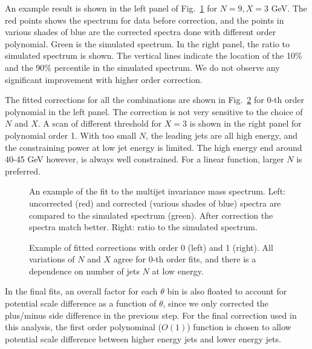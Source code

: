 An example result is shown in the left panel of Fig.~\ref{Figure:JetCalibration-AbsoluteResidualExample} for $N = 9, X = 3$ GeV.  The red points shows the spectrum for data before correction, and the points in various shades of blue are the corrected spectra done with different order polynomial.  Green is the simulated spectrum.  In the right panel, the ratio to simulated spectrum is shown.  The vertical lines indicate the location of the 10\% and the 90\% percentile in the simulated spectrum.  We do not observe any significant improvement with higher order correction.

The fitted corrections for all the combinations are shown in Fig.~\ref{Figure:JetCalibration-AbsoluteResidualFitExample} for 0-th order polynomial in the left panel.  The correction is not very sensitive to the choice of $N$ and $X$.  A scan of different threshold for $X = 3$ is shown in the right panel for polynomial order 1.  With too small $N$, the leading jets are all high energy, and the constraining power at low jet energy is limited.  The high energy end around 40-45 GeV however, is always well constrained.  For a linear function, larger $N$ is preferred.

\begin{figure}[htp!]
    \centering
    \caption{An example of the fit to the multijet invariance mass spectrum.  Left: uncorrected (red) and corrected (various shades of blue) spectra are compared to the simulated spectrum (green).  After correction the spectra match better.  Right: ratio to the simulated spectrum.}
    \label{Figure:JetCalibration-AbsoluteResidualExample}
\end{figure}

\begin{figure}[htp!]
    \centering
    \caption{Example of fitted corrections with order 0 (left) and 1 (right).  All variations of $N$ and $X$ agree for 0-th order fits, and there is a dependence on number of jets $N$ at low energy.}
    \label{Figure:JetCalibration-AbsoluteResidualFitExample}
\end{figure}

In the final fits, an overall factor for each $\theta$ bin is also floated to account for potential scale difference as a function of $\theta$, since we only corrected the plus/minus side difference in the previous step.  For the final correction used in this analysis, the first order polynominal ($O(1)$) function is chosen to allow potential scale difference between higher energy jets and lower energy jets.


\clearpage




